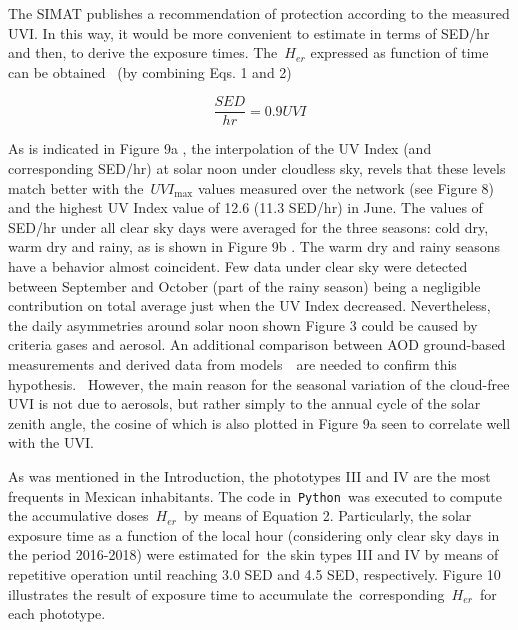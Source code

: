 \documentclass{article}
\begin{document}
{The SIMAT publishes a recommendation of protection according to the
measured UVI. In this way, it would be more convenient to estimate in
terms of SED/hr and then, to derive the exposure times.
The~\(H_{er}\) expressed as function of time can be obtained~
(by combining Eqs. 1 and 2)

\begin{equation}
\frac{SED}{hr}=0.9UVI    
\end{equation}

As is indicated in
Figure 9a%
, the interpolation of the UV
Index (and corresponding SED/hr) at solar noon under cloudless sky,
revels that these levels match better with the~\(UVI_{\max}\) values
measured over the network (see Figure 8) %
and the highest UV Index value of 12.6 (11.3 SED/hr) in June. The values
of SED/hr under all clear sky days were averaged for the three seasons:
cold dry, warm dry and rainy, as is shown in
Figure 9b%
. The warm dry and rainy seasons
have a behavior almost coincident. Few data under clear sky were
detected between September and October (part of the rainy season) being
a negligible contribution on total average just when the UV Index
decreased. Nevertheless, the daily asymmetries around solar noon shown
Figure 3 %
could be caused by criteria
gases and aerosol. An additional comparison between AOD ground-based
measurements and derived data from models~\cite{Castro_2001,Cabrera_2012,Palancar_2012}~are needed
to confirm this hypothesis.~ However, the main reason for the seasonal
variation of the cloud-free UVI is not due to aerosols, but rather
simply to the annual cycle of the solar zenith angle, the cosine of
which is also plotted in Figure 9a %
seen to correlate well with the UVI. ~

As was mentioned in the Introduction, the phototypes III and IV are the
most frequents in Mexican inhabitants. The code in~\texttt{Python}~was
executed to compute the accumulative doses~\(H_{er}\)~by means
of Equation 2. Particularly, the solar exposure time as a function of
the local hour (considering only clear sky days in the period 2016-2018)
were estimated for~the skin types III and IV by means of repetitive
operation until reaching 3.0 SED and 4.5 SED, respectively.
Figure 10 %
illustrates the result of
exposure time to accumulate the~corresponding~\(H_{er}\)~for
each phototype.

}
\end{document}
